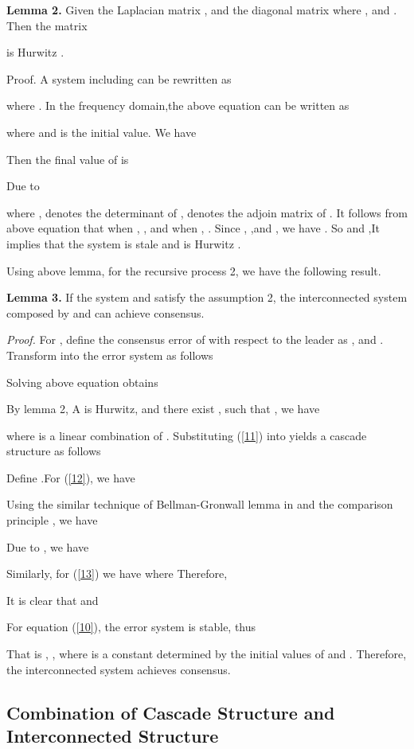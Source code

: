 \documentclass[english]{cccconf}
\begin{document}
{{{\textbf{Lemma 2.}} Given the Laplacian matrix  , and the diagonal matrix   where  , and   .
Then the matrix

is Hurwitz .

Proof.  A system including  can be rewritten as

where
.
 In the frequency domain,the above equation can be written as

where  and   is the initial value.
 We have
 
Then the final value of  is


Due to

where  ,  denotes the determinant of  , denotes the adjoin matrix of  .
It follows from above equation that when  ,
  , and when  , .
Since  , ,and , we have
 .
So   and ,It implies that  the system is stale
and  is Hurwitz .

Using above lemma, for the recursive process 2, we have the following result.

{\textbf{Lemma 3. }}If the system   and   satisfy  the assumption 2, the interconnected system composed by    and     can achieve consensus.

\emph{Proof. } For , define the consensus error of   with respect to the leader   as  , and . Transform   into the error system as follows

Solving above equation obtains

By lemma 2, A is Hurwitz, and  there exist ,  such that  ,
we have

where   is a linear combination of  .
Substituting (\ref{11}) into  yields a cascade structure as follows







Define  .For (\ref{12}), we have

Using the similar technique of  Bellman-Gronwall lemma in \cite{Ioannou2006} and the comparison principle \cite{Khalil2002}, we have



Due to , we have

Similarly, for (\ref{13})  we have  
where 
Therefore,

It is clear that    and

For equation (\ref{10}), the error system is stable, thus

That is , , where  is a constant determined by the initial values of  and . Therefore, the interconnected system  achieves consensus.

\subsection{Combination of  Cascade Structure and Interconnected Structure}

}}
\end{document}

